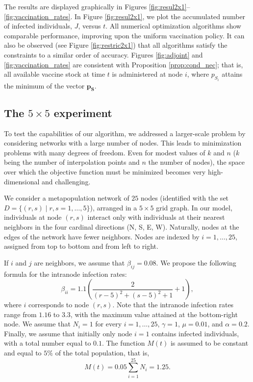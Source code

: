\documentclass[a4paper,10pt]{article}
\theoremstyle{remark}
\begin{document}
The results are displayed graphically in Figures \ref{fig:resul2x1}--\ref{fig:vaccination_rates}. In Figure \ref{fig:resul2x1}, we plot the accumulated number of infected individuals, $J$, versus $t$. All numerical optimization algorithms show comparable performance, improving upon the uniform vaccination policy. It can also be observed (see Figure \ref{fig:restric2x1}) that all algorithms satisfy the constraints to a similar order of accuracy. Figures \ref{fig:adjoint} and \ref{fig:vaccination_rates} are consistent with Proposition \ref{prop:cond_nec}; that is, all available vaccine stock at time $t$ is administered at node $i$, where $p_{S_i}$ attains the minimum of the vector $\mathbf{p_S}$.




\subsection{The $5\times 5$ experiment}

To test the capabilities of our algorithm, we addressed a larger-scale problem by considering networks with a large number of nodes. This leads to minimization problems with many degrees of freedom. Even for modest values of $k$ and $n$ ($k$ being the number of interpolation points and $n$ the number of nodes), the space over which the objective function must be minimized becomes very high-dimensional and challenging.

We consider a metapopulation network of $25$ nodes (identified with the set $D=\{(r,s)\mid r,s=1,\ldots,5\}$), arranged in a $5\times 5$ grid graph. In our model, individuals at node $(r,s)$ interact only with individuals at their nearest neighbors in the four cardinal directions (N, S, E, W). Naturally, nodes at the edges of the network have fewer neighbors. Nodes are indexed by $i=1,\ldots,25$, assigned from top to bottom and from left to right.

If $i$ and $j$ are neighbors, we assume that $\beta_{ij}=0.08$. We propose the following formula for the intranode infection rates:
\[
\beta_{ii}=1.1\left(\frac{2}{(r-5)^2+(s-5)^2+1}+1\right),
\]
where $i$ corresponds to node $(r,s)$. Note that the intranode infection rates range from $1.16$ to $3.3$, with the maximum value attained at the bottom-right node.
We assume that $N_i=1$ for every $i=1,\ldots,25$, $\gamma=1$, $\mu=0.01$, and $\alpha=0.2$. Finally, we assume that initially only node $i=1$ contains infected individuals, with a total number equal to $0.1$. The function $M(t)$ is assumed to be constant and equal to $5\%$ of the total population, that is,
\[
M(t)=0.05\sum_{i=1}^{25}N_i=1.25.
\]
\end{document}
